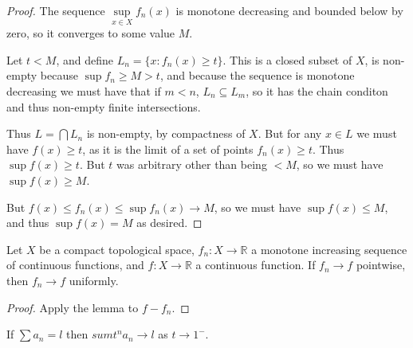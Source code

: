 \begin{proof}
The sequence \(\sup\limits_{x \in X} f_n(x)\) is monotone decreasing and bounded below by zero,
so it converges to some value \(M\).

Let \(t < M\),
and define \(L_n = \{x: f_n(x) \geq t\}\).
This is a closed subset of \(X\),
is non-empty because \(\sup f_n \geq M > t\),
and because the sequence is monotone decreasing we must have that if \(m < n\),
\(L_n \subseteq L_m\),
so it has the chain conditon and thus non-empty finite intersections.

Thus \(L = \bigcap L_n\) is non-empty,
by compactness of \(X\).
But for any \(x \in L\) we must have \(f(x) \geq t\),
as it is the limit of a set of points \(f_n(x) \geq t\).
Thus \(\sup f(x) \geq t\).
But \(t\) was arbitrary other than being \(< M\),
so we must have \(\sup f(x) \geq M\). 

But \(f(x) \leq f_n(x) \leq \sup f_n(x) \to M\),
so we must have \(\sup f(x) \leq M\),
and thus \(\sup f(x) = M\) as desired.
\end{proof}

\begin{corollary}
Let \(X\) be a compact topological space,
\(f_n: X \to \mathbb{R}\) a monotone increasing sequence of continuous functions,
and \(f: X \to \mathbb{R}\) a continuous function.
If \(f_n \to f\) pointwise,
then \(f_n \to f\) uniformly.
\end{corollary}

\begin{proof}
Apply the lemma to \(f - f_n\).
\end{proof}

\begin{lemma}
If \(\sum a_n = l\) then \(sum t^n a_n \to l\) as \(t \to 1^-\).
\end{lemma}

